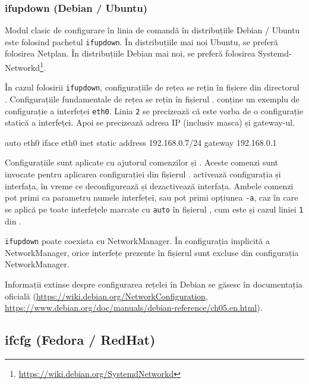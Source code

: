 \subsubsection{ifupdown (Debian / Ubuntu)}
\label{sec:net:linux-config:cli:ifupdown}

Modul clasic de configurare în linia de comandă în distribuțiile Debian / Ubuntu este folosind pachetul \texttt{ifupdown}.
În distribuțiile mai noi Ubuntu, se preferă folosirea Netplan.
În distribuțiile Debian mai noi, se preferă folosirea Systemd-Networkd\footnote{\url{https://wiki.debian.org/SystemdNetworkd}}.

În cazul folosirii \texttt{ifupdown}, configurațiile de rețea se rețin în fișiere din directorul .
Configurațiile fundamentale de rețea se rețin în fișierul .
 conține un exemplu de configurație a interfeței \texttt{eth0}.
Linia \texttt{2} se precizează că este vorba de o configurație statică a interfeței.
Apoi se precizează adresa IP (inclusiv masca) și gateway-ul.

\begin{screen}[caption={Configurație ifupdown în /etc/network/interfaces},label={lst:net:ifupdown}]
auto eth0
iface eth0 inet static
	address 192.168.0.7/24
	gateway 192.168.0.1
\end{screen}

Configurațiile sunt aplicate cu ajutorul comenzilor  și .
Aceste comenzi sunt invocate pentru aplicarea configurației din fișierul .
 activează configurația și interfața, în vreme ce  deconfigurează și dezactivează interfața.
Ambele comenzi pot primi ca parametru numele interfeței, sau pot primi opțiunea \texttt{-a}, caz în care se aplică pe toate interfețele marcate cu \texttt{auto} în fișierul , cum este și cazul liniei \texttt{1} din .

\texttt{ifupdown} poate coexista cu NetworkManager.
În configurația implicită a NetworkManager, orice interfețe prezente în fișierul  sunt excluse din configurația NetworkManager.

Informații extinse despre configurarea rețelei în Debian se găsesc în documentația oficială (\url{https://wiki.debian.org/NetworkConfiguration}, \url{https://www.debian.org/doc/manuals/debian-reference/ch05.en.html}).

\subsection{ifcfg (Fedora / RedHat)}
\label{sec:net:linux-config:cli:ifcfg}

